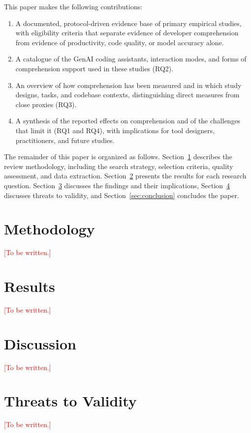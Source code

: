 \documentclass[conference]{IEEEtran}
\newcommand{\todo}[1]{\textcolor{red}{[#1]}}
\begin{document}
This paper makes the following contributions:
\begin{enumerate}
\item A documented, protocol-driven evidence base of primary empirical studies, with eligibility criteria that separate evidence of developer comprehension from evidence of productivity, code quality, or model accuracy alone.
\item A catalogue of the GenAI coding assistants, interaction modes, and forms of comprehension support used in these studies (RQ2).
\item An overview of how comprehension has been measured and in which study designs, tasks, and codebase contexts, distinguishing direct measures from close proxies (RQ3).
\item A synthesis of the reported effects on comprehension and of the challenges that limit it (RQ1 and RQ4), with implications for tool designers, practitioners, and future studies.
\end{enumerate}

The remainder of this paper is organized as follows. Section~\ref{sec:method} describes the review methodology, including the search strategy, selection criteria, quality assessment, and data extraction. Section~\ref{sec:results} presents the results for each research question. Section~\ref{sec:discussion} discusses the findings and their implications, Section~\ref{sec:threats} discusses threats to validity, and Section~\ref{sec:conclusion} concludes the paper.

\section{Methodology}\label{sec:method}
\todo{To be written.}

\section{Results}\label{sec:results}
\todo{To be written.}

\section{Discussion}\label{sec:discussion}
\todo{To be written.}

\section{Threats to Validity}\label{sec:threats}
\todo{To be written.}
\end{document}
